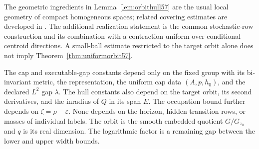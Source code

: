 The geometric ingredients in Lemma~\ref{lem:orbithull57} are the usual local geometry of compact homogeneous spaces; related covering estimates are developed in \cite{Szarek57}. The additional realization statement is the common stochastic-row construction and its combination with a contraction uniform over conditional-centroid directions. A small-ball estimate restricted to the target orbit alone does not imply Theorem~\ref{thm:uniformorbit57}.

\begin{remark}
The cap and executable-gap constants depend only on the fixed group with
its bi-invariant metric, the representation, the uniform cap data
$(A,p,h_0)$, and the declared $L^2$ gap $\lambda$. The hull constants also
depend on the target orbit, its second derivatives, and the inradius of
$Q$ in its span $E$. The occupation bound further depends on
$\zeta=\rho-\varepsilon$. None depends on the horizon, hidden transition
rows, or masses of individual labels. The orbit is the smooth embedded
quotient $G/G_{z_0}$ and $q$ is its real dimension. The logarithmic factor
is a remaining gap between the lower and upper width bounds.
\end{remark}
